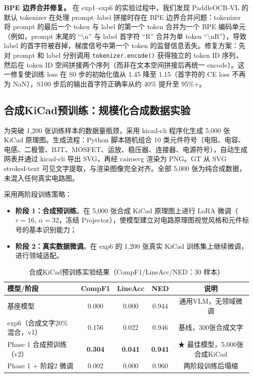 \textbf{BPE 边界合并修复。}
在 exp1--exp6 的实验过程中，我们发现 PaddleOCR-VL 的默认 tokenizer 在处理 prompt--label 拼接时存在 BPE 边界合并问题：tokenizer 将 prompt 的最后一个 token 与 label 的第一个 token 合并为一个 BPE 编码单元（例如，prompt 末尾的 ``\textbackslash n'' 与 label 首字符 ``R'' 合并为单 token ``\textbackslash nR''），导致 label 的首字符被吞掉，梯度信号中第一个 token 的监督信息丢失。修复方案：先对 prompt 和 label 分别调用 \texttt{tokenizer.encode()} 获得独立的 token ID 序列，然后在 token ID 空间拼接两个序列（而非在文本空间拼接后再统一 encode）。这一修复使训练 loss 在 S0 步的初始化值从 1.45 降至 1.15（首字符的 CE loss 不再为 NaN），S100 步后的输出首字符正确率从约 40\% 提升至 95\%+。

\subsection{合成KiCad预训练：规模化合成数据实验}

为突破 1,200 张训练样本的数据量瓶颈，采用 kicad-cli 程序化生成 5,000 张 KiCad 原理图。生成流程：Python 脚本随机组合 10 类元件符号（电阻、电容、电感、二极管、BJT、MOSFET、运放、稳压器、连接器、电源符号），自动生成网表并通过 kicad-cli 导出 SVG，再经 cairosvg 渲染为 PNG。GT 从 SVG stroked-text 可见文字提取，与渲染图像完全对齐。全部 5,000 张为纯合成数据，未混入任何真实电路图。

采用两阶段训练策略：
\begin{itemize}[nosep]
    \item \textbf{阶段 1：合成预训练}。在 5,000 张合成 KiCad 原理图上进行 LoRA 微调（$r=16$, $\alpha=32$，冻结 Projector），使模型建立对电路原理图视觉风格和元件标号的基本识别能力；
    \item \textbf{阶段 2：真实数据微调}。在 exp6 的 1,200 张真实 KiCad 训练集上继续微调，进行领域适配。
\end{itemize}

\begin{table}[h]
\centering
\caption{合成KiCad预训练实验结果（CompF1/LineAcc/NED：30 样本）}
\begin{tabular}{lcccc}
\toprule
\textbf{模型/阶段} & \textbf{CompF1} & \textbf{LineAcc} & \textbf{NED} & \textbf{说明} \\
\midrule
基座模型 & 0.000 & 0.000 & 0.944 & 通用VLM，无领域微调 \\
exp6（合成文字20\%混合，v1） & 0.156 & 0.022 & 0.946 & 基线，300张合成文字 \\
Phase 1 合成预训练（v2） & \textbf{0.304} & \textbf{0.041} & \textbf{0.941} & ★ 最佳模型，5,000张合成KiCad \\
Phase 1 + 阶段2 微调 & 0.002 & 0.000 & 0.960 & 两阶段训练后塌缩 \\
\bottomrule
\end{tabular}
\end{table}

